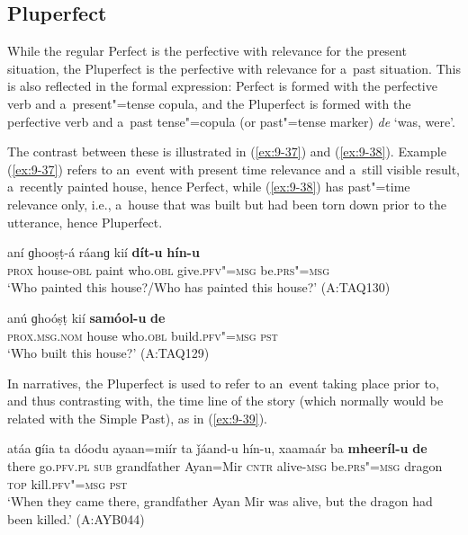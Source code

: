 \subsection{Pluperfect}
\label{subsec:9-1-8}

While the regular Perfect is the perfective with relevance for the present situation, the Pluperfect is the perfective with relevance for a~past situation. This is also reflected in the formal expression: Perfect is formed with the perfective verb and a~present"=tense copula, and the Pluperfect is formed with the perfective verb and a~past tense"=copula (or past"=tense marker) \textit{de} `was, were'. 


The contrast between these is illustrated in (\ref{ex:9-37}) and (\ref{ex:9-38}). Example (\ref{ex:9-37}) refers to an~event with present time relevance and a~still visible result, a~recently painted house, hence Perfect, while (\ref{ex:9-38}) has past"=time relevance only, i.e., a~house that was built but had been torn down prior to the utterance, hence Pluperfect.

\begin{exe}
\ex
\label{ex:9-37}
\gll aní ɡhooṣṭ-á ráanɡ kií \textbf{dít-u} \textbf{hín-u}  \\
\textsc{prox} house-\textsc{obl} paint who.\textsc{obl} give.\textsc{pfv"=msg} be.\textsc{prs"=msg} \\
\glt `Who painted this house?/Who has painted this house?' (A:TAQ130)

\ex
\label{ex:9-38}
\gll anú ɡhoóṣṭ kií \textbf{samóol-u} \textbf{de} \\
\textsc{prox.msg.nom} house who.\textsc{obl} build.\textsc{pfv"=msg} \textsc{pst} \\
\glt `Who built this house?' (A:TAQ129)
\end{exe}

In narratives, the Pluperfect is used to refer to an~event taking place prior to, and thus contrasting with, the time line of the story (which normally would be related with the Simple Past), as in (\ref{ex:9-39}).

\begin{exe}
\ex
\label{ex:9-39}
\gll atáa ɡíia ta dóodu ayaan=miír ta ǰáand-u hín-u, xaamaár ba \textbf{mheeríl-u} \textbf{de} \\
there go.\textsc{pfv.pl} \textsc{sub} grandfather Ayan=Mir \textsc{cntr}  alive-\textsc{msg}
be.\textsc{prs"=msg} dragon \textsc{top} kill.\textsc{pfv"=msg} \textsc{pst} \\
\glt `When they came there, grandfather Ayan Mir was alive, but the dragon had been killed.' (A:AYB044) 
\end{exe}

